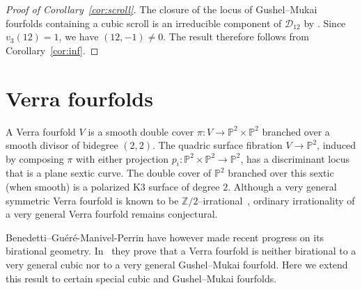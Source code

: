 \documentclass[10pt]{amsart}
\numberwithin{equation}{section}
\theoremstyle{definition}
\theoremstyle{plain}
\numberwithin{theorem}{section}
\def\PP{{\mathbb{P}}}
\def\ZZ{{\mathbb{Z}}}
\begin{document}
\begin{proof}[Proof of Corollary~\ref{cor:scroll}]
The closure of the locus of Gushel--Mukai fourfolds containing
a cubic scroll is an irreducible component of
$\mathcal D_{12}$ by \cite[Proposition~7.6]{debarre2015special}. Since $v_3(12)=1$, we have $(12,-1)\neq0$. The result therefore follows from Corollary~\ref{cor:inf}.
\end{proof}

\section{Verra fourfolds}
A Verra fourfold $V$ is a smooth double cover $\pi: V \rightarrow \PP^2 \times \PP^2$ branched over a smooth divisor of bidegree $(2,2)$. The quadric surface fibration $V \rightarrow \PP^2$, induced by composing $\pi$ with either projection $p_i: \PP^2 \times \PP^2 \rightarrow \PP^2$, has a discriminant locus that is a plane sextic curve. The double cover of $\PP^2$ branched over this sextic (when smooth) is a polarized K3 surface of degree $2$. Although a very general symmetric Verra fourfold is known to be $\ZZ/2$--irrational~\cite[Theorem~6.4]{fay2026equivariantirrationalitygeneralsymmetric}, ordinary irrationality of a very general Verra fourfold remains conjectural.

Benedetti--Guéré-Manivel-Perrin have however made recent progress on its birational geometry. In~\cite[Corollary~19]{benedetti2026quantumcohomologybirationalgeometry} they prove that a Verra fourfold is neither birational to a very general cubic nor to a very general Gushel--Mukai fourfold.  Here we extend this result to certain special cubic and Gushel--Mukai fourfolds. 

\end{document}
